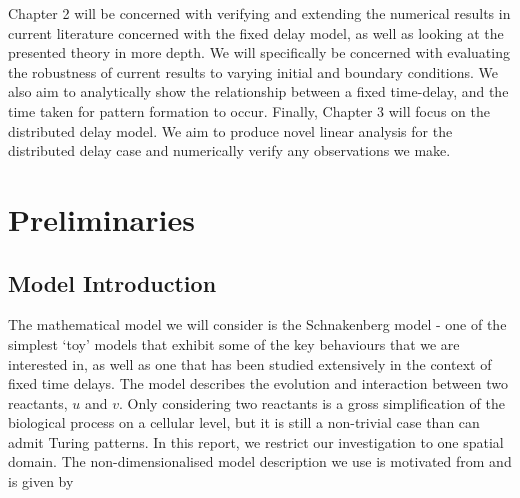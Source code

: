 Chapter 2 will be concerned with verifying and extending the numerical results in current literature concerned with the fixed delay model, as well as looking at the presented theory in more depth. We will specifically be concerned with evaluating the robustness of current results to varying initial and boundary conditions. We also aim to analytically show the relationship between a fixed time-delay, and the time taken for pattern formation to occur. Finally, Chapter 3 will focus on the distributed delay model. We aim to produce novel linear analysis for the distributed delay case and numerically verify any observations we make.

\section{Preliminaries}
\subsection{Model Introduction}
The mathematical model we will consider is the Schnakenberg model \cite{schnakenberg} - one of the simplest `toy' models that exhibit some of the key behaviours that we are interested in, as well as one that has been studied extensively in the context of fixed time delays. The model describes the evolution and interaction between two reactants, $u$ and $v$. Only considering two reactants is a gross simplification of the biological process on a cellular level, but it is still a non-trivial case than can admit Turing patterns. In this report, we restrict our investigation to one spatial domain. The non-dimensionalised model description we use is motivated from \cite{gaffmonk} and is given by

